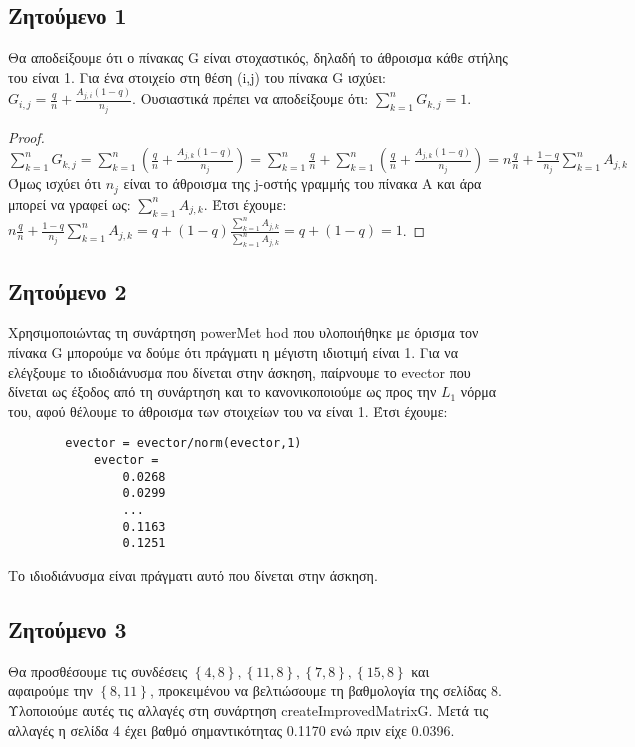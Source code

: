 \documentclass[12pt,a4paper]{article}
\begin{document}
    \subsection*{Zητούμενο 1}
        Θα αποδείξουμε ότι ο πίνακας G είναι στοχαστικός, δηλαδή το άθροισμα κάθε στήλης του είναι 1. Για ένα στοιχείο στη θέση (i,j) του πίνακα G ισχύει: 
        $G_{i,j} = \frac{q}{n} + \frac{A_{j,i}(1-q)}{n_j}$. Ουσιαστικά πρέπει να αποδείξουμε ότι: $\sum\limits_{k=1}^n G_{k,j} = 1$.
        \begin{proof}
            $\sum\limits_{k=1}^n G_{k,j} = \sum\limits_{k=1}^n \left(\frac{q}{n} + \frac{A_{j,k}(1-q)}{n_j}\right) = \sum\limits_{k=1}^n \frac{q}{n} + 
            \sum\limits_{k=1}^n \left(\frac{q}{n} + \frac{A_{j,k}(1-q)}{n_j}\right) = n\frac{q}{n} + \frac{1-q}{n_j} \sum\limits_{k=1}^n A_{j,k}$ Όμως 
            ισχύει ότι $n_j$ είναι το άθροισμα της j-οστής γραμμής του πίνακα Α και άρα μπορεί να γραφεί ως: $\sum\limits_{k=1}^n A_{j,k}$. Έτσι έχουμε: 
            $n\frac{q}{n} + \frac{1-q}{n_j} \sum\limits_{k=1}^n A_{j,k} = q + (1-q)\frac{\sum\limits_{k=1}^n A_{j,k}}{\sum\limits_{k=1}^n A_{j,k}} = 
            q + (1-q) = 1$.
        \end{proof}
    \subsection*{Zητούμενο 2}
        Χρησιμοποιώντας τη συνάρτηση powerMet   hod που υλοποιήθηκε με όρισμα τον πίνακα G μπορούμε να δούμε ότι πράγματι η μέγιστη ιδιοτιμή είναι 1. Για να ελέγξουμε 
        το ιδιοδιάνυσμα που δίνεται στην άσκηση, παίρνουμε το evector που δίνεται ως έξοδος από τη συνάρτηση και το κανονικοποιούμε ως προς την $L_1$ νόρμα του, αφού 
        θέλουμε το άθροισμα των στοιχείων του να είναι 1. Έτσι έχουμε:
        \begin{lstlisting}
        evector = evector/norm(evector,1)
            evector =
                0.0268
                0.0299
                ...
                0.1163
                0.1251
        \end{lstlisting}
        Το ιδιοδιάνυσμα είναι πράγματι αυτό που δίνεται στην άσκηση.

    \subsection*{Zητούμενο 3}
        Θα προσθέσουμε τις συνδέσεις $\left\{4,8\right\}, \left\{11,8\right\}, \left\{7,8\right\}, \left\{15,8\right\}$ και \\αφαιρούμε την $\left\{8,11\right\}$, 
        προκειμένου να βελτιώσουμε τη βαθμολογία της σελίδας 8. Υλοποιούμε αυτές τις αλλαγές στη συνάρτηση createImprovedMatrixG. Μετά τις αλλαγές η σελίδα 4 
        έχει βαθμό σημαντικότητας 0.1170 ενώ πριν είχε 0.0396.
\end{document}
